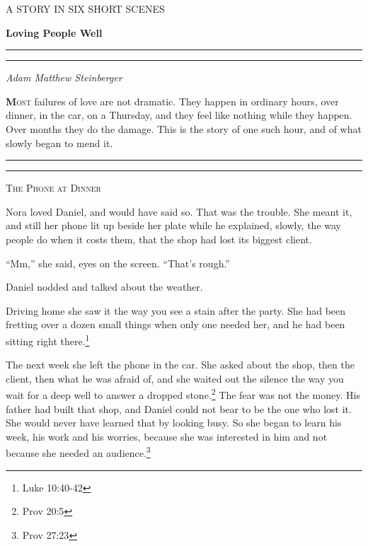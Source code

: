 \documentclass[10.5pt]{article}
\newcommand{\diamondrule}{%
  \begin{center}
    \vspace{-0.5em}
    \rule{0.25\textwidth}{0.4pt}\hspace{0.5em}\raisebox{-0.2ex}{\small$\blacklozenge$}\hspace{0.5em}\rule{0.25\textwidth}{0.4pt}
    \vspace{-0.5em}
  \end{center}
}
\begin{document}
\begin{titlepage}
    \centering
    \vspace*{1.8in}
    {\scshape\footnotesize A STORY IN SIX SHORT SCENES\par}
    \vspace{0.6in}
    {\Huge\textbf{Loving People Well}\par}
    \vspace{0.3in}
    \diamondrule
    \vspace{0.4in}
    {\itshape\large Adam Matthew Steinberger\par}
    \vfill
\end{titlepage}

\newpage
\setcounter{page}{2}

\lettrine[lines=3,findent=3pt,nindent=0pt]{\textbf{M}}{ost} failures of love are not dramatic. They happen in ordinary hours, over dinner, in the car, on a Thursday, and they feel like nothing while they happen. Over months they do the damage. This is the story of one such hour, and of what slowly began to mend it.

\vspace{1.5em}
\diamondrule
\vspace{1.5em}

\begin{center}
    {\scshape\large The Phone at Dinner}\par
    \vspace{0.8em}
\end{center}

Nora loved Daniel, and would have said so. That was the trouble. She meant it, and still her phone lit up beside her plate while he explained, slowly, the way people do when it costs them, that the shop had lost its biggest client.

``Mm,'' she said, eyes on the screen. ``That's rough.''

Daniel nodded and talked about the weather.

Driving home she saw it the way you see a stain after the party. She had been fretting over a dozen small things when only one needed her, and he had been sitting right there.\footnote{Luke 10:40-42}

The next week she left the phone in the car. She asked about the shop, then the client, then what he was afraid of, and she waited out the silence the way you wait for a deep well to answer a dropped stone.\footnote{Prov 20:5} The fear was not the money. His father had built that shop, and Daniel could not bear to be the one who lost it. She would never have learned that by looking busy. So she began to learn his week, his work and his worries, because she was interested in him and not because she needed an audience.\footnote{Prov 27:23}
\end{document}
